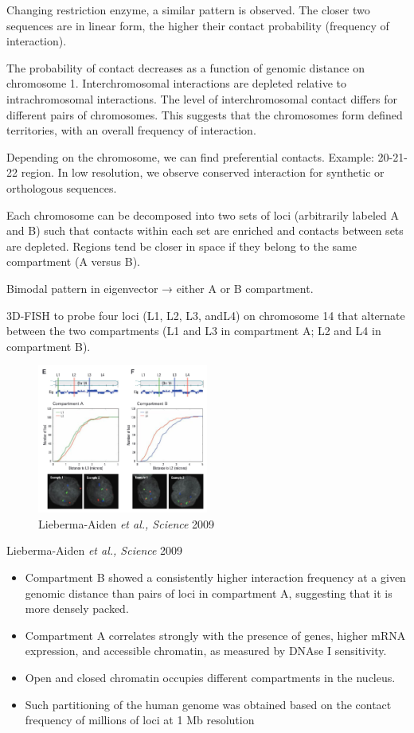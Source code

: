 Changing restriction enzyme, a similar pattern is observed. The closer two sequences are in linear form, the higher their contact probability (frequency of interaction).

The probability of contact decreases as a function of genomic distance on chromosome 1. Interchromosomal interactions are depleted relative to intrachromosomal interactions. The level of interchromosomal contact differs for different pairs of chromosomes. This suggests that the chromosomes form defined territories, with an overall frequency of interaction.

Depending on the chromosome, we can find preferential contacts. Example: 20-21-22 region. In low resolution, we observe conserved interaction for synthetic or orthologous sequences.

Each chromosome can be decomposed into two sets of loci (arbitrarily labeled A and B) such that contacts within each set are enriched and contacts between sets are depleted. Regions tend be closer in space if they belong to the same compartment (A versus B).

Bimodal pattern in eigenvector → either A or B compartment.

3D-FISH to probe four loci (L1, L2, L3, andL4) on chromosome 14 that alternate between the two compartments (L1 and L3 in compartment A; L2 and L4 in compartment B).

\begin{figure}
\centering
\includegraphics[width=0.5\textwidth]{../_resources/Screenshot_2022-10-19_at_09-06-00.png}
\caption{Lieberma-Aiden \emph{et al., Science} 2009}
\end{figure}

Lieberma-Aiden \emph{et al., Science} 2009

\begin{itemize}
\tightlist
\item
  Compartment B showed a consistently higher interaction frequency at a given genomic distance than pairs of loci in compartment A, suggesting that it is more densely packed.
\item
  Compartment A correlates strongly with the presence of genes, higher mRNA expression, and accessible chromatin, as measured by DNAse I sensitivity.
\item
  Open and closed chromatin occupies different compartments in the nucleus.
\item
  Such partitioning of the human genome was obtained based on the contact frequency of millions of loci at 1 Mb resolution
\end{itemize}

